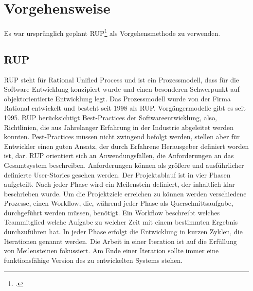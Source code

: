 \chapter{Vorgehensweise}
\reiter
Es war ursprünglich geplant RUP\footcite{Lehrunterlagen-RUP} als Vorgehensmethode zu verwenden. 
\section{RUP}
RUP steht für Rational Unified Process und ist ein Prozessmodell, dass für die Software-Entwicklung konzipiert wurde und einen besonderen Schwerpunkt auf objektorientierte Entwicklung legt. Das Prozessmodell wurde von der Firma Rational entwickelt und besteht seit 1998 als RUP. Vorgängermodelle gibt es seit 1995. 
RUP berücksichtigt Best-Practices der Softwareentwicklung, also, Richtlinien, die aus Jahrelanger Erfahrung in der Industrie abgeleitet werden konnten. Pest-Practices müssen nicht zwingend befolgt werden, stellen aber für Entwickler einen guten Ansatz, der durch Erfahrene Herausgeber definiert worden ist, dar. 
RUP orientiert sich an Anwendungsfällen, die Anforderungen an das Gesamtsystem beschreiben. Anforderungen können als größere und ausführlicher definierte User-Stories gesehen werden.  
Der Projektablauf ist in vier Phasen aufgeteilt. Nach jeder Phase wird ein Meilenstein definiert, der inhaltlich klar beschrieben wurde.
Um die Projektziele erreichen zu können werden verschiedene Prozesse, einen Workflow, die, während jeder Phase als Querschnittsaufgabe, durchgeführt werden müssen, benötigt. Ein Workflow beschreibt welches Teammitglied welche Aufgabe zu welcher Zeit mit einem bestimmten Ergebnis durchzuführen hat.
In jeder Phase erfolgt die Entwicklung in kurzen Zyklen, die Iterationen genannt werden. Die Arbeit in einer Iteration ist auf die Erfüllung von Meilensteinen fokussiert. Am Ende einer Iteration sollte immer eine funktionsfähige Version des zu entwickelten Systems stehen.
\newpage
